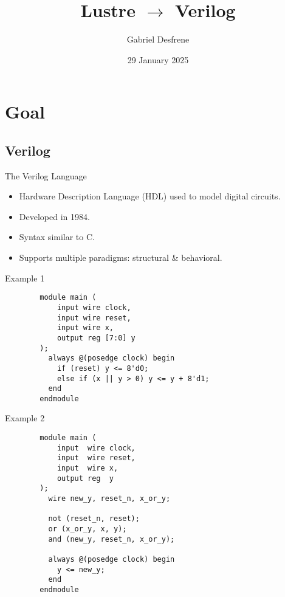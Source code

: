 \documentclass{beamer}
\title{Lustre \texorpdfstring{$\to$}{->} Verilog}
\author{Gabriel Desfrene}
\date{29 January 2025}
\begin{document}
\maketitle

\section{Goal}

\subsection{Verilog}

\begin{frame}{The Verilog Language}
    \begin{itemize}
        \item Hardware Description Language (HDL) used to model digital circuits.
        \item  Developed in 1984.
        \item Syntax similar to C.
        \item Supports multiple paradigms: structural \& behavioral.
    \end{itemize}
\end{frame}

\begin{frame}[fragile]{Example 1}
    \begin{verbatim}
        module main (
            input wire clock,
            input wire reset,
            input wire x,
            output reg [7:0] y
        );
          always @(posedge clock) begin
            if (reset) y <= 8'd0;
            else if (x || y > 0) y <= y + 8'd1;
          end
        endmodule
    \end{verbatim}
\end{frame}

\begin{frame}[fragile]{Example 2}
    \begin{verbatim}
        module main (
            input  wire clock,
            input  wire reset,
            input  wire x,
            output reg  y
        );
          wire new_y, reset_n, x_or_y;

          not (reset_n, reset);
          or (x_or_y, x, y);
          and (new_y, reset_n, x_or_y);

          always @(posedge clock) begin
            y <= new_y;
          end
        endmodule
    \end{verbatim}
\end{frame}
\end{document}

